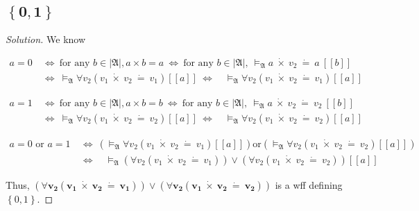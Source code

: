 \documentclass{article}
\newcommand{\set}[1]{\left\{#1\right\}}
\newenvironment{solution}{\begin{proof}[\noindent\it Solution]}{\end{proof}}
\begin{document}
\subsection{$\boldsymbol{\set{0,1}}$}
\vspace{1em}
\begin{solution}
    We know

    \vspace{-3em}
    \begin{align*}
        a=0\ &\Longleftrightarrow\ \text{for any } b\in|\mathfrak{A}|, a\times b=a  \  \Longleftrightarrow\ \text{for any }b\in|\mathfrak{A}|,\ \vDash_\mathfrak{A} a\ \dot{\times}\ v_2\ \dot{=}\ a\ [\![b]\!] \ \  \\
        & \Longleftrightarrow\ \vDash_\mathfrak{A} \forall v_2 \left(v_1\ \dot{\times}\ v_2\ \dot{=}\ v_1\right)[\![a]\!]\ \Longleftrightarrow\quad\vDash_\mathfrak{A} \forall v_2 \left(v_1\ \dot{\times}\ v_2\ \dot{=}\ v_1\right)[\![a]\!]
    \end{align*}

    \vspace{-4.2em}
    \begin{align*}
        a=1\ &\Longleftrightarrow\ \text{for any } b\in|\mathfrak{A}|, a\times b = b \ \Longleftrightarrow\ \text{for any }b\in|\mathfrak{A}|,\ \vDash_\mathfrak{A} a\ \dot{\times}\ v_2\ \dot{=}\ v_2\ [\![b]\!] \\
        & \Longleftrightarrow\ \vDash_\mathfrak{A} \forall v_2 \left(v_1\ \dot{\times}\ v_2\ \dot{=}\ v_2\right)[\![a]\!]\  \Longleftrightarrow\quad\vDash_\mathfrak{A} \forall v_2 \left(v_1\ \dot{\times}\ v_2\ \dot{=}\ v_2\right)[\![a]\!]
    \end{align*}

    \vspace{-4.2em}
    \begin{align*}
        a = 0\text{ or }a = 1\ &\Longleftrightarrow\ \left(\vDash_\mathfrak{A} \forall v_2 \left(v_1\ \dot{\times}\ v_2\ \dot{=}\ v_1\right)[\![a]\!]\right) \text{or}\left(\vDash_\mathfrak{A} \forall v_2 \left(v_1\ \dot{\times}\ v_2\ \dot{=}\ v_2\right)[\![a]\!]\right) \\
        & \Longleftrightarrow\quad\vDash_\mathfrak{A}\left(\forall v_2 \left(v_1\ \dot{\times}\ v_2\ \dot{=}\ v_1\right)\right) \lor \left(\forall v_2 \left(v_1\ \dot{\times}\ v_2\ \dot{=}\ v_2\right)\right)[\![a]\!]
    \end{align*}

    \hspace{2.6em}
    Thus, $\boldsymbol{\left(\forall v_2 \left(v_1\ \dot{\times}\ v_2\ \dot{=}\ v_1\right)\right) \lor \left(\forall v_2 \left(v_1\ \dot{\times}\ v_2\ \dot{=}\ v_2\right)\right)}$ is a wff defining $\set{0,1}$.
\end{solution}
\end{document}
